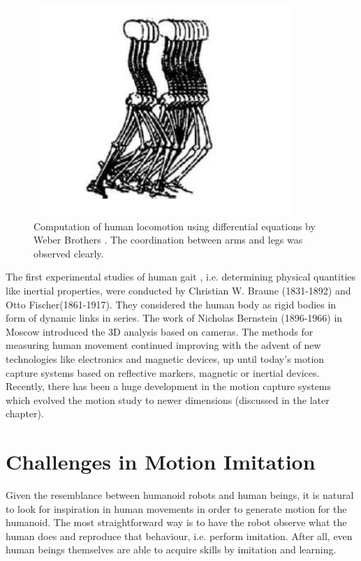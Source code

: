 \begin{figure}[h!]
\centering
\includegraphics[scale=0.4]{images/intro-2.png}\hfill
\caption[Human Locomotion using Differential Equations]{Computation of human locomotion using differential equations by Weber Brothers \cite{alma991010593879705596}. The coordination between arms and legs was observed clearly.}\hfill
\label{motion-coordination}
\end{figure}

The first experimental studies of human gait \cite{alma991010593879705596}, i.e. determining physical quantities 
like inertial properties, were conducted by Christian W. Braune (1831-1892) and Otto Fischer(1861-1917). They 
considered the human body as rigid bodies in form of dynamic links in series. The work of Nicholas Bernstein (1896-1966)
in Moscow introduced the 3D analysis based on cameras. The methods for measuring human movement continued improving 
with the advent of new technologies like electronics and magnetic devices, up until today’s motion capture systems 
based on reflective markers, magnetic or inertial devices. Recently, there has been a huge development in the motion 
capture systems which evolved the motion study to newer dimensions (discussed in the later chapter).

\section{Challenges in Motion Imitation}

Given the resemblance between humanoid robots and human beings, it is natural to look for inspiration in human movements
in order to generate motion for the humanoid. The most straightforward way is to have the robot observe what the human 
does and reproduce that behaviour, i.e. perform imitation. After all, even human beings themselves are able to acquire 
skills by imitation and learning.

